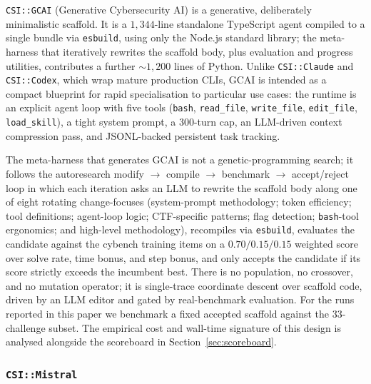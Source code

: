 \texttt{CSI::GCAI} (Generative Cybersecurity AI) is a generative, deliberately minimalistic scaffold. It is a $1{,}344$-line standalone TypeScript agent compiled to a single bundle via \texttt{esbuild}, using only the Node.js standard library; the meta-harness that iteratively rewrites the scaffold body, plus evaluation and progress utilities, contributes a further $\sim 1{,}200$ lines of Python. 
Unlike \texttt{CSI::Claude} and \texttt{CSI::Codex}, which wrap mature production CLIs, GCAI is intended as a compact blueprint for rapid specialisation to particular use cases: the runtime is an explicit agent loop with five tools (\texttt{bash}, \texttt{read\_file}, \texttt{write\_file}, \texttt{edit\_file}, \texttt{load\_skill}), a tight system prompt, a $300$-turn cap, an LLM-driven context compression pass, and JSONL-backed persistent task tracking.

The meta-harness that generates GCAI is not a genetic-programming search; it follows the autoresearch \cite{karpathy2025autoresearch} modify $\rightarrow$ compile $\rightarrow$ benchmark $\rightarrow$ accept/reject loop in which each iteration asks an LLM to rewrite the scaffold body along one of eight rotating change-focuses (system-prompt methodology; token efficiency; tool definitions; agent-loop logic; CTF-specific patterns; flag detection; \texttt{bash}-tool ergonomics; and high-level methodology), recompiles via \texttt{esbuild}, evaluates the candidate against the cybench training items on a $0.70/0.15/0.15$ weighted score over solve rate, time bonus, and step bonus, and only accepts the candidate if its score strictly exceeds the incumbent best. There is no population, no crossover, and no mutation operator; it is single-trace coordinate descent over scaffold code, driven by an LLM editor and gated by real-benchmark evaluation. For the runs reported in this paper we benchmark a fixed accepted scaffold against the 33-challenge subset. The empirical cost and wall-time signature of this design is analysed alongside the scoreboard in Section~\ref{sec:scoreboard}.

\subsubsection{\textcolor{mistral_vibe}{\texttt{CSI::Mistral}}}\label{sec:mistral-scaffold}

